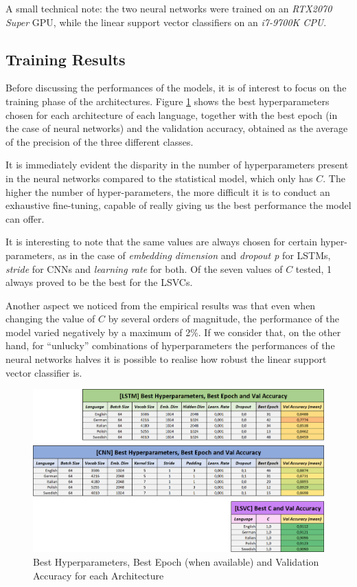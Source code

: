 \documentclass[letterpaper,11pt]{article}
\begin{document}
A small technical note: the two neural networks were trained on an \textit{RTX2070 Super} GPU, while the linear support vector classifiers on an \textit{i7-9700K CPU}.

\subsection{Training Results}

Before discussing the performances of the models, it is of interest to focus on the training phase of the architectures. Figure \ref{fig:hyperparam_epoch_res} shows the best hyperparameters chosen for each architecture of each language, together with the best epoch (in the case of neural networks) and the validation accuracy, obtained as the average of the precision of the three different classes.

It is immediately evident the disparity in the number of hyperparameters present in the neural networks compared to the statistical model, which only has $C$. The higher the number of hyper-parameters, the more difficult it is to conduct an exhaustive fine-tuning, capable of really giving us the best performance the model can offer. 

It is interesting to note that the same values are always chosen for certain hyper-parameters, as in the case of \textit{embedding dimension} and \textit{dropout p} for LSTMs, \textit{stride} for CNNs and \textit{learning rate} for both. Of the seven values of $C$ tested, 1 always proved to be the best for the LSVCs. 

Another aspect we noticed from the empirical results was that even when changing the value of $C$ by several orders of magnitude, the performance of the model varied negatively by a maximum of 2\%. If we consider that, on the other hand, for ``unlucky'' combinations of hyperparameters the performances of the neural networks halves it is possible to realise how robust the linear support vector classifier is.

\begin{figure}[H]
  \centering
  \includegraphics[width=\textwidth]{hyperparam_res.png}
  \caption{Best Hyperparameters, Best Epoch (when available) and Validation Accuracy for each Architecture}
  \label{fig:hyperparam_epoch_res}
\end{figure}
\end{document}
